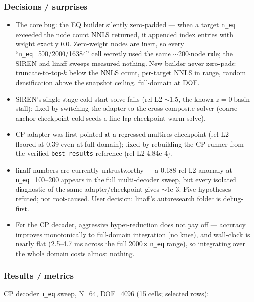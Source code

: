 \subsubsection*{Decisions / surprises}
\begin{itemize}
  \item The core bug: the EQ builder silently zero-padded --- when a target \texttt{n\_eq} exceeded the node count NNLS returned, it appended index entries with weight exactly 0.0. Zero-weight nodes are inert, so every ``\texttt{n\_eq}=500/2000/16384'' cell secretly used the same $\sim$200-node rule; the SIREN and linaff sweeps measured nothing. New builder never zero-pads: truncate-to-top-$k$ below the NNLS count, per-target NNLS in range, random densification above the snapshot ceiling, full-domain at DOF.
  \item SIREN's single-stage cold-start solve fails (rel-L2 $\sim$1.5, the known $z{=}0$ basin stall); fixed by switching the adapter to the cross-composite solver (coarse anchor checkpoint cold-seeds a fine lap-checkpoint warm solve).
  \item CP adapter was first pointed at a regressed multires checkpoint (rel-L2 floored at 0.39 even at full domain); fixed by rebuilding the CP runner from the verified \texttt{best-results} reference (rel-L2 4.84e-4).
  \item linaff numbers are currently untrustworthy --- a 0.188 rel-L2 anomaly at \texttt{n\_eq}=100--200 appears in the full multi-decoder sweep, but every isolated diagnostic of the same adapter/checkpoint gives $\sim$1e-3. Five hypotheses refuted; not root-caused. User decision: linaff's autoresearch folder is debug-first.
  \item For the CP decoder, aggressive hyper-reduction does not pay off --- accuracy improves monotonically to full-domain integration (no knee), and wall-clock is nearly flat (2.5--4.7 ms across the full 2000$\times$ \texttt{n\_eq} range), so integrating over the whole domain costs almost nothing.
\end{itemize}

\subsubsection*{Results / metrics}
CP decoder \texttt{n\_eq} sweep, N=64, DOF=4096 (15 cells; selected rows):

